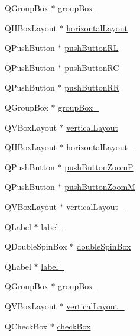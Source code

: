 \begin{DoxyCompactItemize}
Q\-Group\-Box $\ast$ \hyperlink{class_ui___main_window_abb28acde35ffce4d0e6152579df2cbc3}{group\-Box\-\_}
\item 
Q\-H\-Box\-Layout $\ast$ \hyperlink{class_ui___main_window_acd6fdc9ebacc4b25b834162380d75ce8}{horizontal\-Layout}
\item 
Q\-Push\-Button $\ast$ \hyperlink{class_ui___main_window_a95f52bfebed7af8f26c3278c21e3849c}{push\-Button\-R\-L}
\item 
Q\-Push\-Button $\ast$ \hyperlink{class_ui___main_window_a6d475960f07a30a544a97210558c25ce}{push\-Button\-R\-C}
\item 
Q\-Push\-Button $\ast$ \hyperlink{class_ui___main_window_aa77e9c7bb4f79f14a83b557f52d957ac}{push\-Button\-R\-R}
\item 
Q\-Group\-Box $\ast$ \hyperlink{class_ui___main_window_a320d3d7ba1cb8fff7b7b95923ed10f5e}{group\-Box\-\_}
\item 
Q\-V\-Box\-Layout $\ast$ \hyperlink{class_ui___main_window_aecd96a04789fcfec3f98d80390ad8184}{vertical\-Layout}
\item 
Q\-H\-Box\-Layout $\ast$ \hyperlink{class_ui___main_window_a03ce63974cc69b067c91bbf285cceca8}{horizontal\-Layout\-\_}
\item 
Q\-Push\-Button $\ast$ \hyperlink{class_ui___main_window_ad0ad41eba235bd1bc4b8933326d793be}{push\-Button\-Zoom\-P}
\item 
Q\-Push\-Button $\ast$ \hyperlink{class_ui___main_window_aed7dc656feb43fe5ed8eb834b590b762}{push\-Button\-Zoom\-M}
\item 
Q\-V\-Box\-Layout $\ast$ \hyperlink{class_ui___main_window_a0c01bad60d9f422a1258e710635a2f65}{vertical\-Layout\-\_}
\item 
Q\-Label $\ast$ \hyperlink{class_ui___main_window_a78c7e10730b43c6700cd7216911ed76a}{label\-\_}
\item 
Q\-Double\-Spin\-Box $\ast$ \hyperlink{class_ui___main_window_abb8358aecbdaaab56cfae1ac221c1659}{double\-Spin\-Box}
\item 
Q\-Label $\ast$ \hyperlink{class_ui___main_window_ad6bab8fb8903b8f41afea1218ee52695}{label\-\_}
\item 
Q\-Group\-Box $\ast$ \hyperlink{class_ui___main_window_ad8a919e5634add9c41bfc319cb9fd338}{group\-Box\-\_}
\item 
Q\-V\-Box\-Layout $\ast$ \hyperlink{class_ui___main_window_a7b66d5d6ab55f3977317359d09a42345}{vertical\-Layout\-\_}
\item 
Q\-Check\-Box $\ast$ \hyperlink{class_ui___main_window_ae8154204ed56489a091cf3a81af1f996}{check\-Box}

\end{DoxyCompactItemize}
